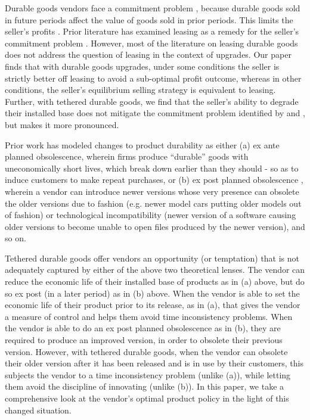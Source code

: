\documentclass[isre,blindrev]{informs3} %
\begin{document}
Durable goods vendors face a commitment problem \citep{coase_durability_1972, bulow_durable-goods_1982}, because durable
goods sold in future periods affect the value of goods sold in prior periods. This limits the seller{'}s profits \citep{stokey_rational_1981}. Prior literature has examined leasing as a remedy for the seller's commitment problem \citep{bulow_durable-goods_1982, bhaskaran_selling_2005}. However, most of the literature on leasing durable goods does not address the question of leasing in the context of upgrades. Our paper finds that with durable goods upgrades, under some conditions the seller is strictly better off leasing to avoid a sub-optimal profit outcome, whereas in other conditions, the seller's equilibrium selling strategy is equivalent to leasing. Further, with tethered durable goods, we find that the seller's ability to degrade their installed base does not mitigate the commitment problem identified by \cite{coase_durability_1972} and  \cite{bulow_durable-goods_1982}, but makes it more pronounced.

Prior work has modeled changes to product durability as either (a) ex ante planned obsolescence, wherein firms produce {``}durable{''} goods with uneconomically short lives, which break down earlier than they should
\citep{bulow_economic_1986}  - so as to induce customers to make repeat purchases, or (b) ex post planned obsolescence \citep{waldman_new_1993}, wherein a vendor can introduce newer versions whose very presence can obsolete the older versions due to fashion (e.g. newer model cars putting older models out of fashion) or technological incompatibility (newer version of a software causing older versions to become unable to open files produced by the newer version), and so on. 

Tethered durable goods offer vendors an opportunity (or temptation) that is not adequately captured by either of the above two theoretical lenses. The vendor can reduce the economic life of their installed base of products as in (a) above, but do so ex post (in a later period) as in (b) above. When the vendor is able to set the economic life of their product prior to its release, as in (a), that gives the vendor a measure of control and helps them avoid time inconsistency problems. When the vendor is able to do an ex post planned obsolescence as in (b), they are required to produce an improved version, in order to obsolete their previous version. However, with tethered durable goods, when the vendor can obsolete their older version after it has been released and is in use by their customers, this subjects the vendor to a time inconsistency problem (unlike (a)), while letting them avoid the discipline of innovating (unlike (b)). In this paper, we take a comprehensive look at the vendor's optimal product policy in the light of this changed situation.
\end{document}
